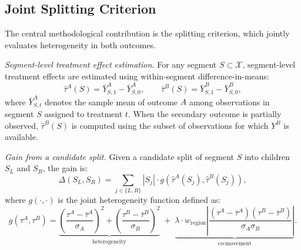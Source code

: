 \documentclass[11pt,letterpaper,english]{article}
\theoremstyle{definition}
\theoremstyle{definition}
\begin{document}
\begin{bibunit}
\subsection{Joint Splitting Criterion}
\label{sec:splitting_criterion}

The central methodological contribution is the splitting criterion, which jointly evaluates heterogeneity in both outcomes.

\vspace{5mm}
\noindent
\emph{Segment-level treatment effect estimation.}
For any segment $S \subset \mathcal{X}$, segment-level treatment effects are estimated using within-segment difference-in-means:
\[
\hat{\tau}^A(S) = \bar{Y}^A_{S,1} - \bar{Y}^A_{S,0}, \qquad
\hat{\tau}^B(S) = \bar{Y}^B_{S,1} - \bar{Y}^B_{S,0},
\]
where $\bar{Y}^A_{S,t}$ denotes the sample mean of outcome $A$ among observations in segment $S$ assigned to treatment $t$. When the secondary outcome is partially observed, $\hat{\tau}^B(S)$ is computed using the subset of observations for which $Y^B$ is available.

\vspace{5mm}
\noindent
\emph{Gain from a candidate split.}
Given a candidate split of segment $S$ into children $S_L$ and $S_R$, the gain is:
\[
\Delta(S_L,S_R)
=
\sum_{j \in \{L,R\}} |S_j| \cdot g\!\left( \hat{\tau}^A(S_j), \hat{\tau}^B(S_j) \right),
\]
where $g(\cdot,\cdot)$ is the joint heterogeneity function defined as:
\begin{equation}
\label{eq:objective}
g(\tau^A,\tau^B)
=
\underbrace{\left( \frac{\tau^A - \bar{\tau}^A}{\sigma_A} \right)^{\!2}
+
\left( \frac{\tau^B - \bar{\tau}^B}{\sigma_B} \right)^{\!2}}_{\text{heterogeneity}}
\;+\;
\underbrace{\lambda \cdot w_{\text{region}}
\left|
\frac{(\tau^A - \bar{\tau}^A)(\tau^B - \bar{\tau}^B)}{\sigma_A \sigma_B}
\right|}_{\text{co-movement}}.
\end{equation}


\end{bibunit}
\end{document}
